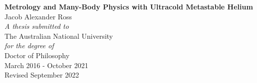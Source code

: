 \begin{titlepage}
\begin{center}
\vspace{0.45cm}
\LARGE{\textbf{Metrology and Many-Body Physics with Ultracold Metastable Helium\\}}
\vspace{0.5cm}
\large{Jacob Alexander Ross\\}
\mbox{}
\vfill
\vspace{0.15cm}
\normalsize{\emph{A thesis submitted to \\}}
\large{The Australian National University\\}
\normalsize{\emph{for the degree of\\}}
\large{Doctor of Philosophy \\}
\vspace{0.5cm}
\normalsize{March 2016 - October 2021}\\
\normalsize{Revised September 2022}\\




\end{center}
\end{titlepage}


